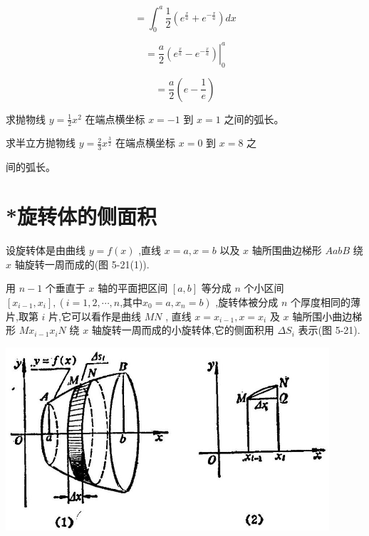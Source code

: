 \documentclass[lang=cn,newtx,10pt,scheme=chinese]{elegantbook}
\begin{document}
\[
= {\int }_{0}^{a}\frac{1}{2}\left( {{e}^{\frac{x}{a}} + {e}^{-\frac{x}{a}}}\right) {dx}
\]

\[
= {\left. \frac{a}{2}\left( {e}^{\frac{x}{a}} - {e}^{-\frac{x}{a}}\right) \right| }_{0}^{a}
\]

\[
= \frac{a}{2}\left( {e - \frac{1}{e}}\right)
\]

\begin{problemset}[练习]

\item 求抛物线 \(y = \frac{1}{2}{x}^{2}\) 在端点横坐标 \(x = - 1\) 到 \(x = 1\) 之间的弧长。

\item 求半立方抛物线 \(y = \frac{2}{3}{x}^{\frac{3}{2}}\) 在端点横坐标 \(x = 0\) 到 \(x = 8\) 之

间的弧长。
\end{problemset}

\section{*旋转体的侧面积}

设旋转体是由曲线 \(y = f\left( x\right)\) ,直线 \(x = a,x = b\) 以及 \(x\) 轴所围曲边梯形 \({AabB}\) 绕 \(x\) 轴旋转一周而成的(图 5-21(1)).

用 \(n - 1\) 个垂直于 \(x\) 轴的平面把区间 \(\left\lbrack {a,b}\right\rbrack\) 等分成 \(n\) 个小区间 \(\left\lbrack {{x}_{i - 1},{x}_{i}}\right\rbrack ,\left( {i = 1,2,\cdots ,n\text{,其中}{x}_{0} = a,{x}_{n} = b}\right)\) ,旋转体被分成 \(n\) 个厚度相同的薄片,取第 \(i\) 片,它可以看作是曲线 \({MN}\) , 直线 \(x = {x}_{i - 1},x = {x}_{i}\) 及 \(x\) 轴所围小曲边梯形 \(M{x}_{i - 1}{x}_{i}N\) 绕 \(x\) 轴旋转一周而成的小旋转体,它的侧面积用 \(\Delta {S}_{i}\) 表示(图 5-21).

\begin{center}
\includegraphics[max width=0.9\textwidth]{images/01912c18-5c3f-733d-b775-749ba9897a9d_244_731175.jpg}
\end{center}
\end{document}

